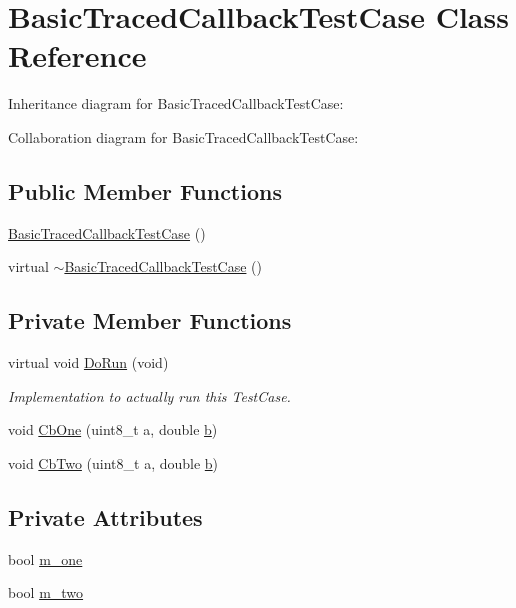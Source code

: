 \hypertarget{classBasicTracedCallbackTestCase}{}\section{Basic\+Traced\+Callback\+Test\+Case Class Reference}
\label{classBasicTracedCallbackTestCase}


Inheritance diagram for Basic\+Traced\+Callback\+Test\+Case\+:


Collaboration diagram for Basic\+Traced\+Callback\+Test\+Case\+:
\subsection*{Public Member Functions}
\begin{DoxyCompactItemize}
\item 
\hyperlink{classBasicTracedCallbackTestCase_a45372996fbd545ca5f71ea40695e1785}{Basic\+Traced\+Callback\+Test\+Case} ()
\item 
virtual \hyperlink{classBasicTracedCallbackTestCase_abfde5ca7b1b43e0ef1811b3502257e32}{$\sim$\+Basic\+Traced\+Callback\+Test\+Case} ()
\end{DoxyCompactItemize}
\subsection*{Private Member Functions}
\begin{DoxyCompactItemize}
\item 
virtual void \hyperlink{classBasicTracedCallbackTestCase_ad4436cb611a61683726c3c2ea2a7aff0}{Do\+Run} (void)
\begin{DoxyCompactList}\small\item\em Implementation to actually run this Test\+Case. \end{DoxyCompactList}\item 
void \hyperlink{classBasicTracedCallbackTestCase_acb573822cead160a028ff63cefbb5e66}{Cb\+One} (uint8\+\_\+t a, double \hyperlink{lte__pathloss_8m_a21ad0bd836b90d08f4cf640b4c298e7c}{b})
\item 
void \hyperlink{classBasicTracedCallbackTestCase_add7162ae75a89256e2528a94d442847d}{Cb\+Two} (uint8\+\_\+t a, double \hyperlink{lte__pathloss_8m_a21ad0bd836b90d08f4cf640b4c298e7c}{b})
\end{DoxyCompactItemize}
\subsection*{Private Attributes}
\begin{DoxyCompactItemize}
\item 
bool \hyperlink{classBasicTracedCallbackTestCase_a64847386a4cf0d07aac0c23639501444}{m\+\_\+one}
\item 
bool \hyperlink{classBasicTracedCallbackTestCase_ae8f2b2a6115490efe626394a676e6da1}{m\+\_\+two}
\end{DoxyCompactItemize}
